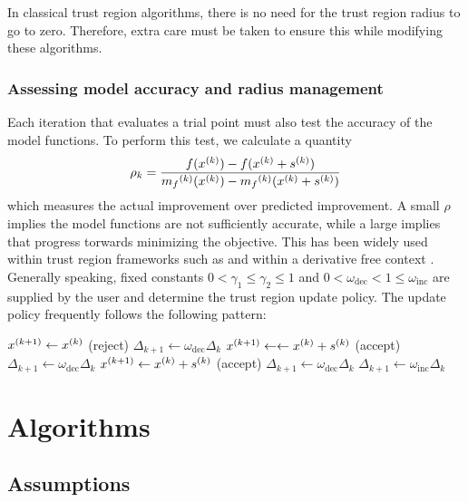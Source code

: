 In classical trust region algorithms, there is no need for the trust region radius to go to zero.
Therefore, extra care must be taken to ensure this while modifying these algorithms.

\subsubsection{Assessing model accuracy and radius management}
Each iteration that evaluates a trial point must also test the accuracy of the model functions.
To perform this test, we calculate a quantity
\begin{equation}
\label{rho}
\rho_k = \frac{f({x}^{(k)}) - f({x}^{(k)}+{s}^{(k)})}{{{m}_f}^{(k)}({x}^{(k)}) - {{m}_f}^{(k)}({x}^{(k)}+{s}^{(k)})}
\end{equation}
which measures the actual improvement over predicted improvement.
A small $\rho$ implies the model functions are not sufficiently accurate, while a large implies that progress torwards minimizing the objective.
This has been widely used within trust region frameworks such as \cite{Conn:2000:TM:357813} and within a derivative free context \cite{DUMMY:intro_book}.
Generally speaking, fixed constants $0 < \gamma_1 \le \gamma_2 \le 1$ and $0 < \omega_{\text{dec}} < 1 \le \omega_{\text{inc}}$ are supplied by the user and determine the trust region update policy.
The update policy frequently follows the following pattern:

\begin{algorithmic}
    \State ${x}^{(k+1)} \gets {x}^{(k)}$ (reject)
    \State $\Delta_{k+1} \gets \omega_{\text{dec}} \Delta_k$
    \State ${x}^{(k+1)}\gets \gets {x}^{(k)} + {s}^{(k)}$ (accept)
    \State $\Delta_{k+1} \gets \omega_{\text{dec}} \Delta_k$
    \State ${x}^{(k+1)} \gets {x}^{(k)} + {s}^{(k)}$ (accept)
    \If
        \State $\Delta_{k+1} \gets \omega_{\text{dec}} \Delta_k$
    \Else
        \State $\Delta_{k+1} \gets \omega_{\text{inc}} \Delta_k$
    \EndIf
\EndIf
\end{algorithmic}




\section{Algorithms}

\subsection{Assumptions}

